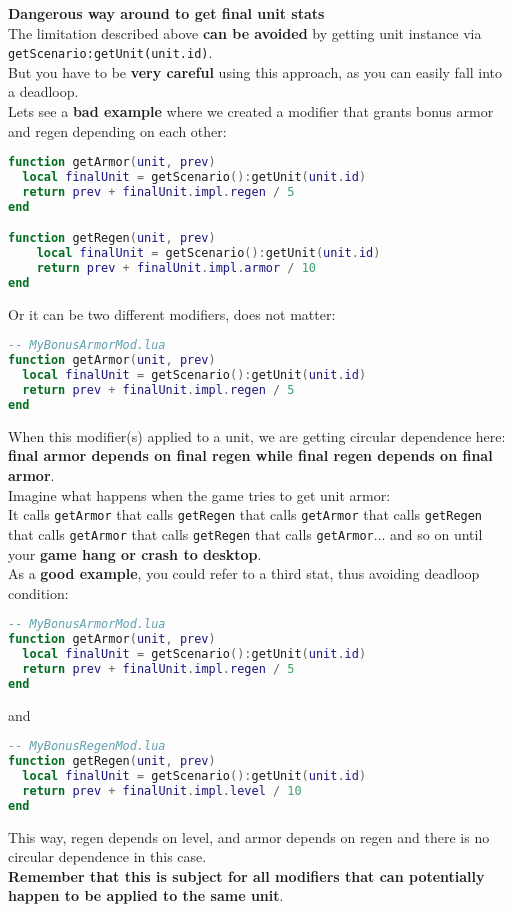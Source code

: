 \textbf{Dangerous way around to get final unit stats}\\
The limitation described above \textbf{can be avoided} by getting unit instance via \texttt{getScenario:getUnit(unit.id)}.\\
But you have to be \textbf{very careful} using this approach, as you can easily fall into a deadloop.\\

Lets see a \textbf{bad example} where we created a modifier that grants bonus armor and regen depending on each other:
\begin{center}
\begin{lstlisting}[language=Lua]
function getArmor(unit, prev)
  local finalUnit = getScenario():getUnit(unit.id)
  return prev + finalUnit.impl.regen / 5
end

function getRegen(unit, prev)
    local finalUnit = getScenario():getUnit(unit.id)
    return prev + finalUnit.impl.armor / 10
end
\end{lstlisting}
\end{center}
Or it can be two different modifiers, does not matter:
\begin{center}
\begin{lstlisting}[language=Lua]
-- MyBonusArmorMod.lua
function getArmor(unit, prev)
  local finalUnit = getScenario():getUnit(unit.id)
  return prev + finalUnit.impl.regen / 5
end
\end{lstlisting}
\end{center}
When this modifier(s) applied to a unit, we are getting circular dependence here: \textbf{final armor depends on final regen while final regen depends on final armor}.\\
Imagine what happens when the game tries to get unit armor:\\
It calls \texttt{getArmor} that calls \texttt{getRegen} that calls \texttt{getArmor} that calls \texttt{getRegen} that calls \texttt{getArmor} that calls \texttt{getRegen} that calls \texttt{getArmor}... and so on until your \textbf{game hang or crash to desktop}.\\

As a \textbf{good example}, you could refer to a third stat, thus avoiding deadloop condition:
\begin{center}
\begin{lstlisting}[language=Lua]
-- MyBonusArmorMod.lua
function getArmor(unit, prev)
  local finalUnit = getScenario():getUnit(unit.id)
  return prev + finalUnit.impl.regen / 5
end
\end{lstlisting}
\end{center}
and
\begin{center}
\begin{lstlisting}[language=Lua]
-- MyBonusRegenMod.lua
function getRegen(unit, prev)
  local finalUnit = getScenario():getUnit(unit.id)
  return prev + finalUnit.impl.level / 10
end
\end{lstlisting}
\end{center}
This way, regen depends on level, and armor depends on regen and there is no circular dependence in this case.\\

\textbf{Remember that this is subject for all modifiers that can potentially happen to be applied to the same unit}.